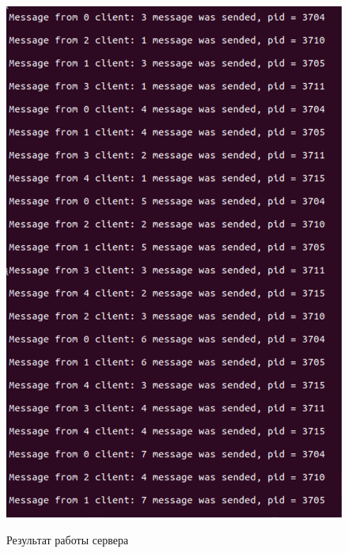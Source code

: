 \documentclass[a4paper,12pt]{article}
\begin{document}
\begin{figure}[h!]
\begin{center}
\begin{minipage}[h!]{0.49\linewidth}
				\includegraphics[width=1\linewidth]{test_server_2_2.png}
			\end{minipage}
			\label{ris:test_server_1_2}
			\caption{Результат работы сервера}
		\end{center}
	\end{figure}
\end{document}
